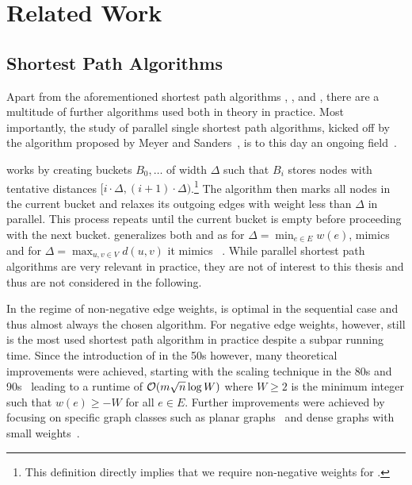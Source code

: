 \chapter{Related Work}\label{sec:related_work}

\section{Shortest Path Algorithms}
Apart from the aforementioned shortest path algorithms \algdk, \algbf, and \algjs, there are a multitude of further algorithms used both in theory in practice.
Most importantly, the study of parallel single shortest path algorithms, kicked off by the \algdt algorithm proposed by Meyer and Sanders~\cite{DeltaStepping}, is to this day an ongoing field~\cite{RadiusStepping, SteppingAlgorithms, DeltaSteppingImprov1, DeltaSteppingImprov2, ApproxSSSP, krhoShortcutting}.  

\algdt works by creating buckets $B_0, \ldots$ of width $\Delta$ such that $B_i$ stores nodes with tentative distances $[i \cdot \Delta, (i + 1) \cdot \Delta)$.\footnote{
  This definition directly implies that we require non-negative weights for \algdt.
}
The algorithm then marks all nodes in the current bucket and relaxes its outgoing edges with weight less than $\Delta$ in parallel.
This process repeats until the current bucket is empty before proceeding with the next bucket.
\algdt generalizes both \algdk and \algbf as for $\Delta = \min_{e \in E}w(e)$, \algdt mimics \algdk and for $\Delta = \max_{u, v \in V}d(u, v)$ it mimics \algbf~\cite{DeltaStepping}. 
While parallel shortest path algorithms are very relevant in practice, they are not of interest to this thesis and thus are not considered in the following.

In the regime of non-negative edge weights, \algdk is optimal in the sequential case and thus almost always the chosen algorithm.
For negative edge weights, however, \algbf still is the most used shortest path algorithm in practice despite a subpar running time.
Since the introduction of \algbf in the 50s however, many theoretical improvements were achieved, starting with the scaling technique in the 80s and 90s~\cite{Scaling1, Scaling2, Scaling3} leading to a runtime of $\mathcal O\!\left(m\sqrt{n}\log W\right)$ where $W \geq 2$ is the minimum integer such that $w(e) \geq -W$ for all $e \in E$.
Further improvements were achieved by focusing on specific graph classes such as planar graphs~\cite{NegSSSPPlanar1, NegSSSPPlanar2, NegSSSPPlanar3, NegSSSPPlanar4} and dense graphs with small weights~\cite{NegSSSPDense}.

